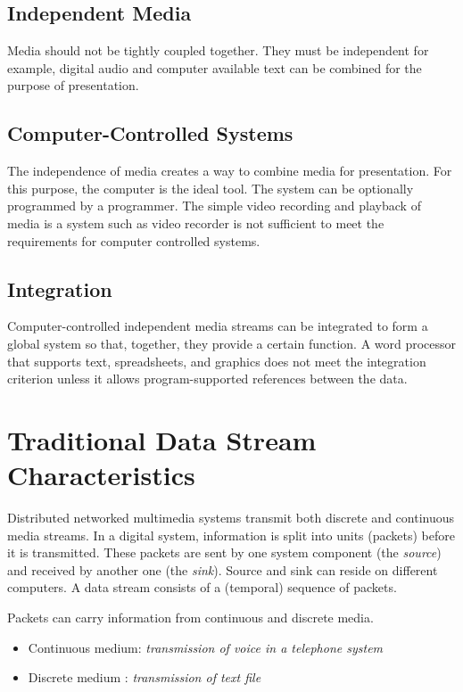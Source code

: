 \subsection{Independent Media}
Media should not be tightly coupled together. They must be independent for example, digital audio and computer available text can be combined for the purpose of presentation. 

\subsection{Computer-Controlled Systems}
The independence of media creates a way to combine media for presentation. For this purpose, the computer is the ideal tool. The system can be optionally programmed by a programmer. The simple video recording and playback of media is a system such as video recorder is not sufficient to meet the requirements for computer controlled systems. 

\subsection{Integration}
Computer-controlled independent media streams can be integrated to form a global system so that, together, they provide a certain function. A word processor
that supports text, spreadsheets, and graphics does not meet the integration criterion
unless it allows program-supported references between the data. 

\section{Traditional Data Stream Characteristics}
Distributed networked multimedia systems transmit both discrete and continuous
media streams. In a digital system, information is split
into units (packets) before it is transmitted. These packets are sent by one system component (the \textit{source}) and received by another one (the \textit{sink}). Source and sink can reside on different computers. A data stream consists of a (temporal) sequence of packets. 

Packets can carry information from continuous and discrete media. 
\begin{itemize}
	\item Continuous medium: \textit{transmission of voice in a telephone system}
	\item Discrete medium : \textit{transmission of text file}
\end{itemize}


